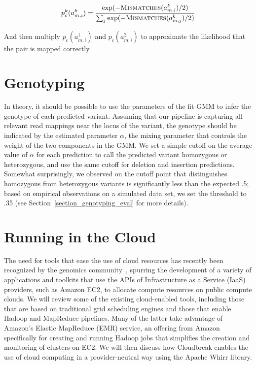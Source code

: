 \[ p^{k}_c(a^{k}_{m,i}) = \frac{\exp({-\textsc{Mismatches}(a^{k}_{m,i})/2)}}{\sum_j{\exp(-\textsc{Mismatches}(a^{k}_{m,j})/2)}} \]

And then multiply $p_c(a^{1}_{m,i})$ and $p_c(a^{2}_{m,i})$ to approximate the likelihood that the pair is mapped correctly.

\section{Genotyping}\label{section_genotyping}

In theory, it should be possible to use the parameters of the fit GMM to infer the genotype of each predicted variant. Assuming that our pipeline is capturing all relevant read mappings near the locus of the variant, the genotype should be indicated by the estimated parameter $\alpha$, the mixing parameter that controls the weight of the two components in the GMM.  We set a simple cutoff on the average value of $\alpha$ for each prediction to call the predicted variant homozygous or heterozygous, and use the same cutoff for deletion and insertion predictions. Somewhat surprisingly, we observed on the cutoff point that distinguishes homozygous from heterozygous variants is significantly less than the expected .5; based on empirical observations on a simulated data set, we set the threshold to .35 (see Section~\ref{section_genotyping_eval} for more details).

\section{Running in the Cloud}\label{section_cloud_whirr}

The need for tools that ease the use of cloud resources has recently been recognized by the genomics community~\cite{Schatz:2010js,Stein:2010gp}, spurring the development of a variety of applications and toolkits that use the APIs of Infrastructure as a Service (IaaS) providers, such as Amazon EC2, to allocate compute resources on public compute clouds. We will review some of the existing cloud-enabled tools, including those that are based on traditional grid scheduling engines and those that enable Hadoop and MapReduce pipelines. Many of the latter take advantage of Amazon's Elastic MapReduce (EMR) service, an offering from Amazon specifically for creating and running Hadoop jobs that simplifies the creation and monitoring of clusters on EC2. We will then discuss how Cloudbreak enables the use of cloud computing in a provider-neutral way using the Apache Whirr library.

